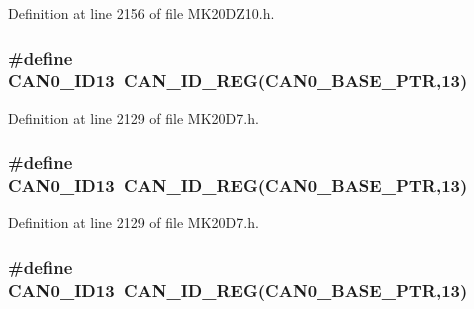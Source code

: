 Definition at line 2156 of file M\+K20\+D\+Z10.\+h.

\subsubsection[{\texorpdfstring{C\+A\+N0\+\_\+\+I\+D13}{CAN0_ID13}}]{\setlength{\rightskip}{0pt plus 5cm}\#define C\+A\+N0\+\_\+\+I\+D13~{\bf C\+A\+N\+\_\+\+I\+D\+\_\+\+R\+EG}({\bf C\+A\+N0\+\_\+\+B\+A\+S\+E\+\_\+\+P\+TR},13)}\hypertarget{group___c_a_n___register___accessor___macros_gada1a0e22b484adde7d0d39688f04219a}{}\label{group___c_a_n___register___accessor___macros_gada1a0e22b484adde7d0d39688f04219a}


Definition at line 2129 of file M\+K20\+D7.\+h.

\subsubsection[{\texorpdfstring{C\+A\+N0\+\_\+\+I\+D13}{CAN0_ID13}}]{\setlength{\rightskip}{0pt plus 5cm}\#define C\+A\+N0\+\_\+\+I\+D13~{\bf C\+A\+N\+\_\+\+I\+D\+\_\+\+R\+EG}({\bf C\+A\+N0\+\_\+\+B\+A\+S\+E\+\_\+\+P\+TR},13)}\hypertarget{group___c_a_n___register___accessor___macros_gada1a0e22b484adde7d0d39688f04219a}{}\label{group___c_a_n___register___accessor___macros_gada1a0e22b484adde7d0d39688f04219a}


Definition at line 2129 of file M\+K20\+D7.\+h.

\subsubsection[{\texorpdfstring{C\+A\+N0\+\_\+\+I\+D13}{CAN0_ID13}}]{\setlength{\rightskip}{0pt plus 5cm}\#define C\+A\+N0\+\_\+\+I\+D13~{\bf C\+A\+N\+\_\+\+I\+D\+\_\+\+R\+EG}({\bf C\+A\+N0\+\_\+\+B\+A\+S\+E\+\_\+\+P\+TR},13)}\hypertarget{group___c_a_n___register___accessor___macros_gada1a0e22b484adde7d0d39688f04219a}{}\label{group___c_a_n___register___accessor___macros_gada1a0e22b484adde7d0d39688f04219a}



